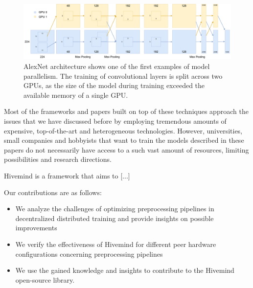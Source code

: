 \begin{figure}[h]
    \caption{AlexNet \cite{alexnet2012} architecture shows one of the first examples of model parallelism. The training of convolutional layers is split across two GPUs, as the size of the model during training exceeded the available memory of a single GPU.}
    \label{fig:alexnet}
    \includegraphics[width=\textwidth]{./figures/alexnet.pdf}
\end{figure}

Most of the frameworks and papers built on top of these techniques approach the issues that we have discussed before by employing tremendous amounts of expensive, top-of-the-art and heterogeneous technologies.
However, universities, small companies and hobbyists that want to train the models described in these papers do not necessarily have access to a such vast amount of resources, limiting possibilities and research directions.


Hivemind \cite{riabinin2020hivemind} is a framework that aims to [...]

Our contributions are as follows:
\begin{itemize}
    \item We analyze the challenges of optimizing preprocessing pipelines in decentralized distributed training and provide insights on possible improvements
    \item We verify the effectiveness of Hivemind for different peer hardware configurations concerning preprocessing pipelines
    \item We use the gained knowledge and insights to contribute to the Hivemind open-source library.
\end{itemize}
